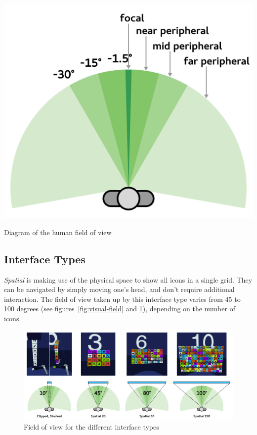 \documentclass{tufte-book} %
\begin{document}
\begin{marginfigure}
  \includegraphics[width=\linewidth]{visual-field.png}
  \caption{Diagram of the human field of view}
  \label{fig:visual-field}
\end{marginfigure}

\subsection{Interface Types}
\emph{Spatial} is making use of the physical space to show all icons in a single grid. They can be navigated by simply moving one's head, and don't require additional interaction. The field of view taken up by this interface type varies from 45 to 100 degrees (see figures~\ref{fig:visual-field} and \ref{fig:fov-types}), depending on the number of icons.

\begin{figure}[h]
  \includegraphics[width=\linewidth]{fov-types.png}
  \caption{Field of view for the different interface types}
  \label{fig:fov-types}
\end{figure}
\end{document}
